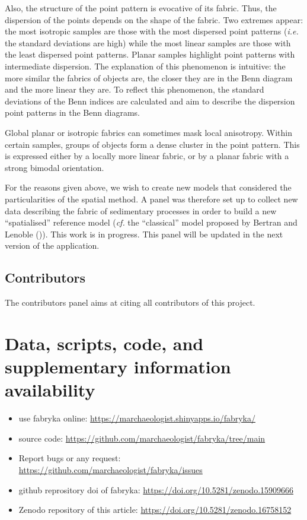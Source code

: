 \documentclass[
]{article}
\providecommand{\tightlist}{%
  \setlength{\itemsep}{0pt}\setlength{\parskip}{0pt}}
\begin{document}
Also, the structure of the point pattern is evocative of its fabric.
Thus, the dispersion of the points depends on the shape of the fabric.
Two extremes appear: the most isotropic samples are those with the most
dispersed point patterns (\emph{i.e.} the standard deviations are high)
while the most linear samples are those with the least dispersed point
patterns. Planar samples highlight point patterns with intermediate
dispersion. The explanation of this phenomenon is intuitive: the more
similar the fabrics of objects are, the closer they are in the Benn
diagram and the more linear they are. To reflect this phenomenon, the
standard deviations of the Benn indices are calculated and aim to
describe the dispersion point patterns in the Benn diagrams.

Global planar or isotropic fabrics can sometimes mask local anisotropy.
Within certain samples, groups of objects form a dense cluster in the
point pattern. This is expressed either by a locally more linear fabric,
or by a planar fabric with a strong bimodal orientation.

For the reasons given above, we wish to create new models that
considered the particularities of the spatial method. A panel was
therefore set up to collect new data describing the fabric of
sedimentary processes in order to build a new ``spatialised'' reference
model (\emph{cf.} the ``classical'' model proposed by Bertran and
Lenoble ()). This work is in progress.
This panel will be updated in the next version of the application.

\bigbreak

\subsection{Contributors}\label{contributors}

The contributors panel aims at citing all contributors of this project.
\bigbreak

\section{Data, scripts, code, and supplementary information
availability}\label{data-scripts-code-and-supplementary-information-availability}

\begin{itemize}
\tightlist
\item
  use fabryka online: \url{https://marchaeologist.shinyapps.io/fabryka/}
  \smallbreak
\item
  source code: \url{https://github.com/marchaeologist/fabryka/tree/main}
  \smallbreak
\item
  Report bugs or any request:
  \url{https://github.com/marchaeologist/fabryka/issues} \smallbreak
\item
  github reprository doi of fabryka:
  \url{https://doi.org/10.5281/zenodo.15909666} \smallbreak
\item
  Zenodo repository of this article:
  \url{https://doi.org/10.5281/zenodo.16758152} \bigbreak
\end{itemize}
\end{document}
